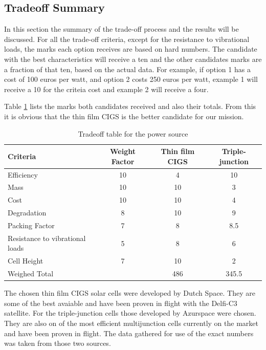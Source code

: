 \subsection{Tradeoff Summary}
In this section the summary of the trade-off process and the results will be discussed. For all the trade-off criteria, except for the resistance to vibrational loads, the marks each option receives are based on hard numbers. The candidate with the best characteristics will receive a ten and the other candidates marks are a fraction of that ten, based on the actual data. For example, if option 1 has a cost of 100 euros per watt, and option 2 costs 250 euros per watt, example 1 will receive a 10 for the criteia cost and example 2 will receive a four.

Table \ref{tab:TO_summary} lists the marks both candidates received and also their totals. From this it is obvious that the thin film \ac{CIGS} is the better candidate for our mission.

\begin{table}
\begin{tabular}{l|c|c|c}
 \textbf{Criteria} & \textbf{Weight Factor} & \textbf{Thin film CIGS} & \textbf{Triple-junction} \\ \hline 
  \hline
 Efficiency & 10 & 4 & 10 \\ 
 Mass & 10 & 10 & 3 \\ 
 Cost & 10 & 10 & 4 \\ 
 Degradation & 8 & 10 & 9 \\ 
 Packing Factor & 7 & 8 & 8.5 \\ 
 Resistance to vibrational loads & 5 & 8 & 6 \\ 
 Cell Height & 7 & 10 & 2 \\ 
 \hline
 Weighed Total & & 486 & 345.5 \\ 
 \end{tabular}
 \caption{Tradeoff table for the power source}
 \label{tab:TO_summary}
 \end{table}
 
The chosen thin film CIGS solar cells were developed by Dutch Space. They are some of the best avaiable and have been proven in flight with the Delfi-C3 satellite. For the triple-junction cells those developed by Azurspace were chosen. They are also on of the most efficient multijunction cells currently on the market and have been proven in flight. The data gathered for use of the exact numbers was taken from those two sources.

